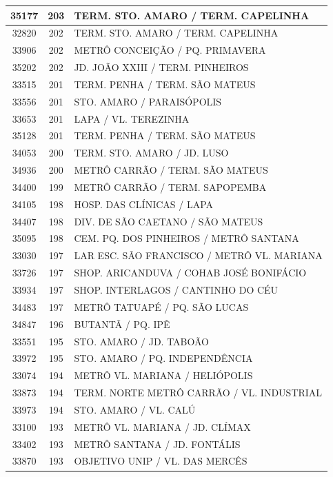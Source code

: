 \documentclass[
	12pt,				%
	oneside,			%
	a4paper,			%
	english,			%
	brazil				%
	]{abntex2ppgsi}
\begin{document}
{{{\begin{apendicesenv}
\begin{longtable}{c|c|p{7cm}}
 \hline 
35177 &	203 &	TERM. STO. AMARO / TERM. CAPELINHA \\ 
 \hline 
32820 &	202 &	TERM. STO. AMARO / TERM. CAPELINHA \\ 
 \hline 
33906 &	202 &	METRÔ CONCEIÇÃO / PQ. PRIMAVERA \\ 
 \hline 
35202 &	202 &	JD. JOÃO XXIII / TERM. PINHEIROS \\ 
 \hline 
33515 &	201 &	TERM. PENHA / TERM. SÃO MATEUS \\ 
 \hline 
33556 &	201 &	STO. AMARO / PARAISÓPOLIS \\ 
 \hline 
33653 &	201 &	LAPA / VL. TEREZINHA \\ 
 \hline 
35128 &	201 &	TERM. PENHA / TERM. SÃO MATEUS \\ 
 \hline 
34053 &	200 &	TERM. STO. AMARO / JD. LUSO \\ 
 \hline 
34936 &	200 &	METRÔ CARRÃO / TERM. SÃO MATEUS \\ 
 \hline 
34400 &	199 &	METRÔ CARRÃO / TERM. SAPOPEMBA \\ 
 \hline 
34105 &	198 &	HOSP. DAS CLÍNICAS / LAPA \\ 
 \hline 
34407 &	198 &	DIV. DE SÃO CAETANO / SÃO MATEUS \\ 
 \hline 
35095 &	198 &	CEM. PQ. DOS PINHEIROS / METRÔ SANTANA \\ 
 \hline 
33030 &	197 &	LAR ESC. SÃO FRANCISCO / METRÔ VL. MARIANA \\ 
 \hline 
33726 &	197 &	SHOP. ARICANDUVA / COHAB JOSÉ BONIFÁCIO \\ 
 \hline 
33934 &	197 &	SHOP. INTERLAGOS / CANTINHO DO CÉU \\ 
 \hline 
34483 &	197 &	METRÔ TATUAPÉ / PQ. SÃO LUCAS \\ 
 \hline 
34847 &	196 &	BUTANTÃ / PQ. IPÊ \\ 
 \hline 
33551 &	195 &	STO. AMARO / JD. TABOÃO \\ 
 \hline 
33972 &	195 &	STO. AMARO / PQ. INDEPENDÊNCIA \\ 
 \hline 
33074 &	194 &	METRÔ VL. MARIANA / HELIÓPOLIS \\ 
 \hline 
33873 &	194 &	TERM. NORTE METRÔ CARRÃO / VL. INDUSTRIAL \\ 
 \hline 
33973 &	194 &	STO. AMARO / VL. CALÚ \\ 
 \hline 
33100 &	193 &	METRÔ VL. MARIANA / JD. CLÍMAX \\ 
 \hline 
33402 &	193 &	METRÔ SANTANA / JD. FONTÁLIS \\ 
 \hline 
33870 &	193 &	OBJETIVO UNIP / VL. DAS MERCÊS \\ 

\end{longtable}
\end{apendicesenv}}}}
\end{document}
